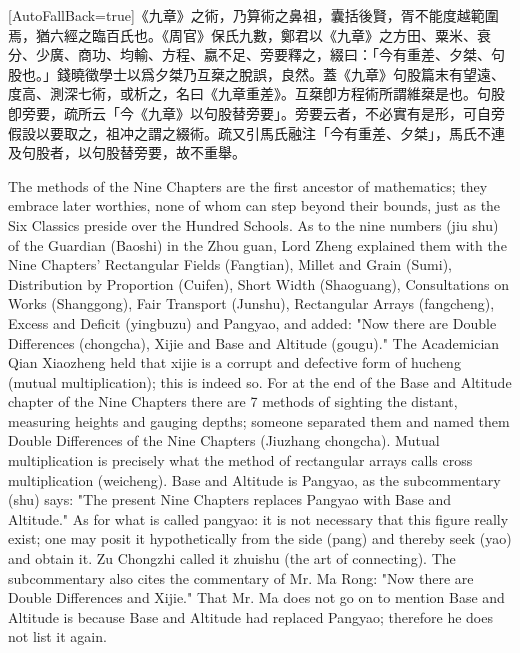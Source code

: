 \documentclass[11pt]{article}
\newcommand{\unitlabel}[1]{\marginpar{\raggedleft\tiny\color{gray}#1}}
\newenvironment{unitzh}{\par\CJKfontspec{Noto Serif CJK SC}[AutoFallBack=true]\large\linespread{1.25}\selectfont}{\par}
\newenvironment{uniten}{\par\small\color{black!85}}{\par\medskip}
\begin{document}
\begin{unitzh}\unitlabel{jiuzhang-042.8}《九章》之術，乃算術之鼻祖，囊括後賢，胥不能度越範圍焉，猶六經之臨百氏也。《周官》保氏九數，鄭君以《九章》之方田、粟米、衰分、少廣、商功、均輸、方程、嬴不足、旁要釋之，綴曰：「今有重差、夕桀、句股也。」錢曉徵學士以爲夕桀乃互椉之脫誤，良然。蓋《九章》句股篇末有望遠、度高、測深七術，或析之，名曰《九章重差》。互椉卽方程術所謂維椉是也。句股卽旁要，疏所云「今《九章》以句股替旁要」。旁要云者，不必實有是形，可自旁假設以要取之，祖冲之謂之綴術。疏又引馬氏融注「今有重差、夕桀」，馬氏不連及句股者，以句股替旁要，故不重舉。\end{unitzh}
\begin{uniten}The methods of the Nine Chapters are the first ancestor of mathematics; they embrace later worthies, none of whom can step beyond their bounds, just as the Six Classics preside over the Hundred Schools. As to the nine numbers (jiu shu) of the Guardian (Baoshi) in the Zhou guan, Lord Zheng explained them with the Nine Chapters' Rectangular Fields (Fangtian), Millet and Grain (Sumi), Distribution by Proportion (Cuifen), Short Width (Shaoguang), Consultations on Works (Shanggong), Fair Transport (Junshu), Rectangular Arrays (fangcheng), Excess and Deficit (yingbuzu) and Pangyao, and added: "Now there are Double Differences (chongcha), Xijie and Base and Altitude (gougu)." The Academician Qian Xiaozheng held that xijie is a corrupt and defective form of hucheng (mutual multiplication); this is indeed so. For at the end of the Base and Altitude chapter of the Nine Chapters there are 7 methods of sighting the distant, measuring heights and gauging depths; someone separated them and named them Double Differences of the Nine Chapters (Jiuzhang chongcha). Mutual multiplication is precisely what the method of rectangular arrays calls cross multiplication (weicheng). Base and Altitude is Pangyao, as the subcommentary (shu) says: "The present Nine Chapters replaces Pangyao with Base and Altitude." As for what is called pangyao: it is not necessary that this figure really exist; one may posit it hypothetically from the side (pang) and thereby seek (yao) and obtain it. Zu Chongzhi called it zhuishu (the art of connecting). The subcommentary also cites the commentary of Mr. Ma Rong: "Now there are Double Differences and Xijie." That Mr. Ma does not go on to mention Base and Altitude is because Base and Altitude had replaced Pangyao; therefore he does not list it again.\end{uniten}
\end{document}
